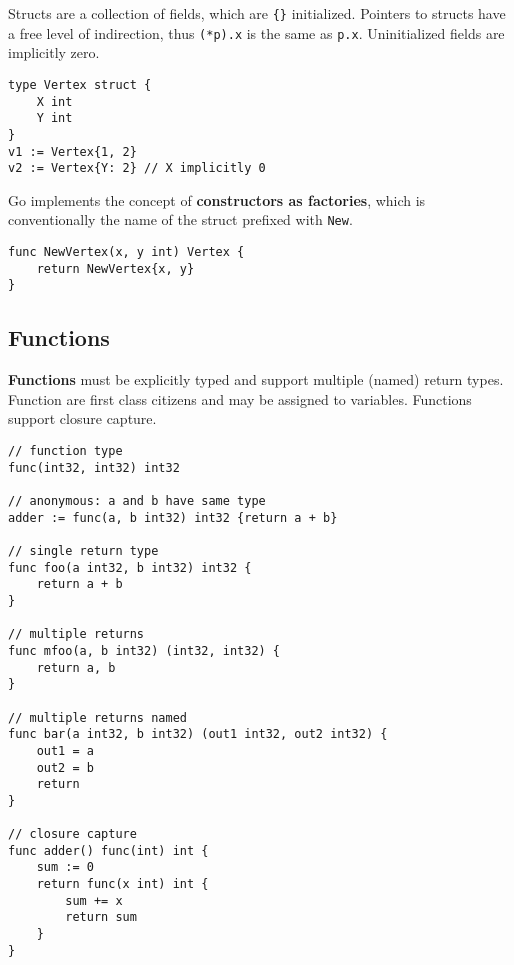 \documentclass{article}
\begin{document}
\begin{paracol}{2}
Structs are a collection of fields, which are \lstinline|{}| initialized. Pointers to structs have a free level of indirection, thus \lstinline{(*p).x} is the same as \lstinline{p.x}. Uninitialized fields are implicitly zero.
\switchcolumn    


\begin{lstlisting}
type Vertex struct {
    X int
    Y int
}
v1 := Vertex{1, 2}
v2 := Vertex{Y: 2} // X implicitly 0
\end{lstlisting}

\switchcolumn*

\noindent Go implements the concept of \textbf{constructors as factories}, which is conventionally the name of the struct prefixed with \lstinline|New|.

\switchcolumn
\begin{lstlisting}
func NewVertex(x, y int) Vertex {
    return NewVertex{x, y}
}
\end{lstlisting}

\end{paracol}

\subsection{Functions}

\noindent \textbf{Functions} must be explicitly typed and support multiple (named) return types.
Function are first class citizens and may be assigned to variables. Functions support closure capture.
\\

\begin{lstlisting}
// function type
func(int32, int32) int32

// anonymous: a and b have same type
adder := func(a, b int32) int32 {return a + b}

// single return type
func foo(a int32, b int32) int32 {
    return a + b
}

// multiple returns
func mfoo(a, b int32) (int32, int32) {
    return a, b
}

// multiple returns named
func bar(a int32, b int32) (out1 int32, out2 int32) {
    out1 = a
    out2 = b
    return
}

// closure capture
func adder() func(int) int {
    sum := 0
    return func(x int) int {
        sum += x
        return sum
    }
}
\end{lstlisting}
\end{document}
